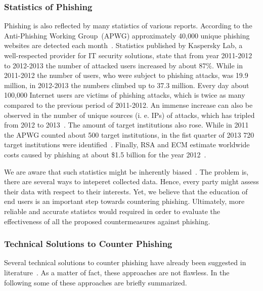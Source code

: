 \subsubsection{Statistics of Phishing}
\label{s:stats}
Phishing is also reflected by many statistics of various reports.
 According to the Anti-Phishing Working Group~(APWG) approximately 40,000 unique phishing websites are detected each month~\cite{antiphishingtrendreport2013}. Statistics published by Kaspersky Lab, a well-respected provider for IT security solutions, state that from year 2011-2012 to 2012-2013 the number of attacked users increased by about 87\%. While in 2011-2012 the number of users, who were subject to phishing attacks, was 19.9 million, in 2012-2013 the numbers climbed up to 37.3 million.
 Every day about 100,000 Internet users are victims of phishing attacks, which is twice as many compared to the previous period of 2011-2012. An immense increase can also be observed in the number of unique sources (i.
e.
 IPs) of attacks, which has tripled from 2012 to 2013~\cite{kasperskyreport2013}. The amount of target institutions also rose.
 While in 2011 the APWG counted about 500 target institutions, in the fist quarter of 2013 720 target institutions were identified~\cite{antiphishingglobalreport2013}. 
Finally, RSA and ECM estimate worldwide costs caused by phishing at about \$1.5 billion for the year 2012~\cite{rsa2013}.

We are aware that such statistics might be inherently biased~\cite{moore2010hard}. 
The problem is, there are several ways to inteperet collected data.
Hence, every party might assess their data with respect to their interests.
Yet, we believe that the education of end users is an important step towards countering phishing. 
Ultimately, more reliable and accurate statistcs would required in order to evaluate the effectiveness of all the proposed countermeasures against phishing.

\subsubsection{Technical Solutions to Counter Phishing}

Several technical solutions to counter phishing have already been suggested in literature~\cite{purkait2012phishing}. 
As a matter of fact, these approaches are not flawless. 
In the following some of these approaches are briefly summarized.

